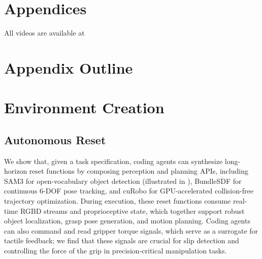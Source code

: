 
\newpage
\appendix

\section*{Appendices}
\startcontents[appendix]

All videos are available at \website

\section*{Appendix Outline}

\section{Environment Creation}






















\subsection{Autonomous Reset}
We show that, given a task specification, coding agents can synthesize long-horizon reset functions by composing perception and planning APIs, including SAM3 for open-vocabulary object detection (illustrated in ), BundleSDF for continuous 6-DOF pose tracking, and cuRobo for GPU-accelerated collision-free trajectory optimization. During execution, these reset functions consume real-time RGBD streams and proprioceptive state, which together support robust object localization, grasp pose generation, and motion planning. Coding agents can also command and read gripper torque signals, which serve as a surrogate for tactile feedback; we find that these signals are crucial for slip detection and controlling the force of the grip in precision-critical manipulation tasks.

